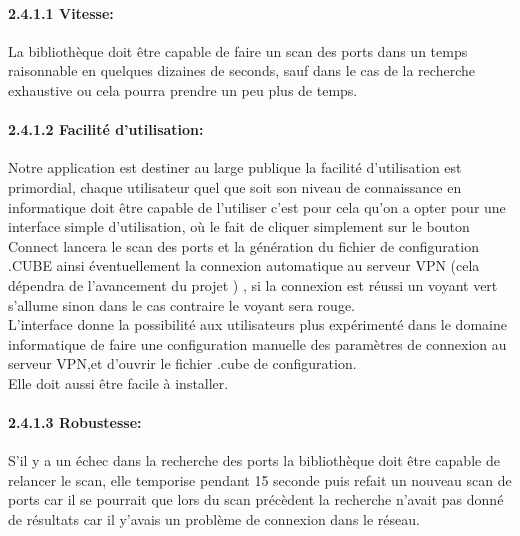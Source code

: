 \documentclass[12pt,a4paper]{article}
\begin{document}
\paragraph{2.4.1.1 Vitesse: }
La bibliothèque doit être capable de faire un scan des ports dans un temps raisonnable en quelques dizaines de seconds, sauf dans le cas de la recherche exhaustive ou cela pourra prendre un peu plus de temps.
\paragraph{2.4.1.2 Facilité d'utilisation: }
Notre application est destiner au large publique la facilité d’utilisation est primordial, chaque utilisateur quel que soit son niveau de connaissance en informatique doit être capable de l’utiliser c’est pour cela qu’on a opter pour une interface simple d’utilisation, où le fait de cliquer simplement sur le bouton Connect lancera le scan des ports et la génération du fichier de configuration .CUBE ainsi éventuellement la connexion automatique au serveur VPN (cela dépendra de l’avancement du projet ) , si la connexion est réussi un voyant vert s’allume sinon dans le cas contraire le voyant sera rouge.\\

L'interface donne la possibilité aux utilisateurs plus expérimenté dans le domaine informatique de faire une configuration manuelle des paramètres de connexion au serveur VPN,et d'ouvrir le fichier .cube de configuration.\\
Elle doit aussi être facile à installer.
 \setlength{\parskip}{1ex}
\paragraph{2.4.1.3 Robustesse: }
S’il y a un échec dans la recherche des ports la bibliothèque doit être capable de relancer le scan, elle temporise pendant 15 seconde puis refait un nouveau scan de ports car il se pourrait que lors du scan précèdent la recherche n’avait pas donné de résultats car il y’avais un problème de connexion dans le réseau.
\end{document}
